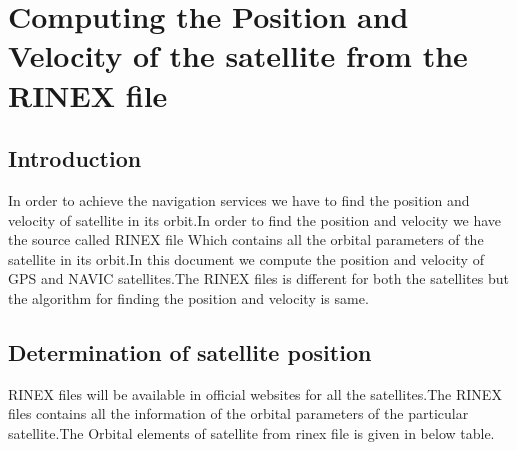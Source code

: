 \documentclass[10pt]{book}
\begin{document}
\chapter{Computing the Position and Velocity of the satellite from the RINEX file}
\section{Introduction}
In order to achieve the navigation services we have to find the position and velocity of satellite in its orbit.In order to find the position and velocity we have the source called RINEX file Which contains all the orbital parameters of the satellite in its orbit.In this document we  compute the position and velocity of GPS and NAVIC satellites.The RINEX files is different for both the satellites but the algorithm for finding the position and velocity is same.
\section{Determination of satellite position}
RINEX files will be available in official websites for all the satellites.The RINEX files contains all the information of the orbital parameters of the particular satellite.The Orbital elements of satellite from rinex file is given in below table.
\end{document}
